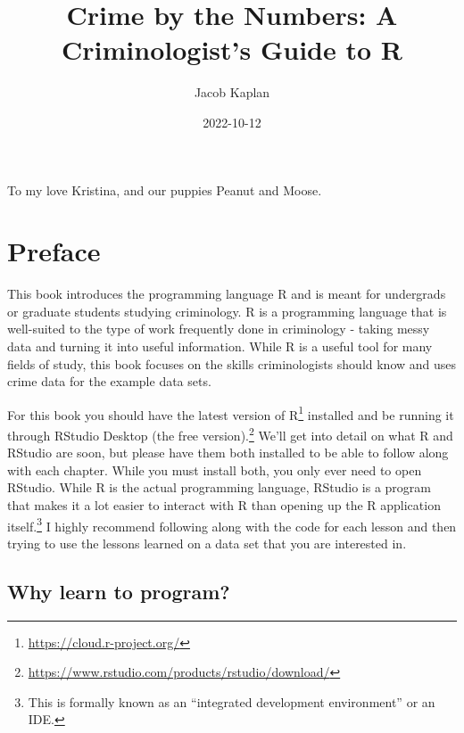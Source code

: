 \documentclass[
]{krantz}
\title{Crime by the Numbers: A Criminologist's Guide to R}
\author{Jacob Kaplan}
\date{2022-10-12}
\renewcommand{\href}[2]{#2\footnote{\url{#1}}}
\begin{document}
\maketitle

\thispagestyle{empty}
\begin{center}
To my love Kristina, and our puppies Peanut and Moose.
\end{center}

\setlength{\abovedisplayskip}{-5pt}
\setlength{\abovedisplayshortskip}{-5pt}

{
\hypersetup{linkcolor=}
\setcounter{tocdepth}{2}
\tableofcontents
}

\frontmatter

\hypertarget{preface}{%
\chapter*{Preface}\label{preface}}


This book introduces the programming language R and is meant
for undergrads or graduate students studying criminology. R
is a programming language that is well-suited to the type of
work frequently done in criminology - taking messy data and
turning it into useful information. While R is a useful tool
for many fields of study, this book focuses on the skills
criminologists should know and uses crime data for the
example data sets.

For this book you should have the latest version of
\href{https://cloud.r-project.org/}{R} installed and be
running it through
\href{https://www.rstudio.com/products/rstudio/download/}{RStudio
Desktop (the free version).} We'll get into detail on what R
and RStudio are soon, but please have them both installed to
be able to follow along with each chapter. While you must
install both, you only ever need to open RStudio. While R is
the actual programming language, RStudio is a program that
makes it a lot easier to interact with R than opening up the
R application itself.\footnote{This is formally known as an
  ``integrated development environment'' or an IDE.} I
highly recommend following along with the code for each
lesson and then trying to use the lessons learned on a data
set that you are interested in.

\hypertarget{why-learn-to-program}{%
\section*{Why learn to
program?}\label{why-learn-to-program}}
\end{document}
